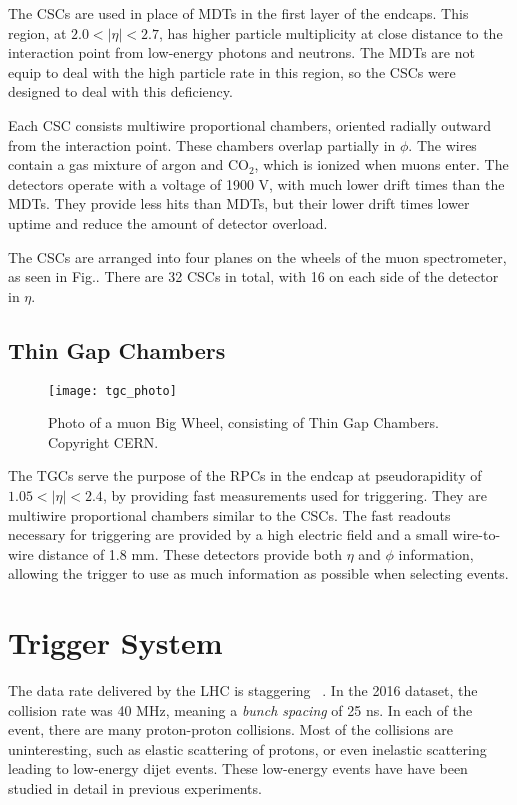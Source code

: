 The CSCs are used in place of MDTs in the first layer of the endcaps.
This region, at $2.0 < |\eta| < 2.7$, has higher particle multiplicity at close distance to the interaction point from low-energy photons and neutrons.
The MDTs are not equip to deal with the high particle rate in this region, so the CSCs were designed to deal with this deficiency.

Each CSC consists multiwire proportional chambers, oriented radially outward from the interaction point.
These chambers overlap partially in $\phi$.
The wires contain a gas mixture of argon and CO$_2$, which is ionized when muons enter.
The detectors operate with a voltage of 1900 V, with much lower drift times than the MDTs.
They provide less hits than MDTs, but their lower drift times lower uptime and reduce the amount of detector overload.

The CSCs are arranged into four planes on the wheels of the muon spectrometer, as seen in Fig..
There are 32 CSCs in total, with 16 on each side of the detector in $\eta.$

\subsection{Thin Gap Chambers}
\begin{figure}[tbp]
\caption{Photo of a muon Big Wheel, consisting of Thin Gap Chambers. Copyright CERN.} \label{fig:tgc_photo}
\texttt{[image: tgc\_photo]}
\end{figure}

The TGCs serve the purpose of the RPCs in the endcap at pseudorapidity of $1.05 < |\eta| < 2.4 $, by providing fast measurements used for triggering.
They are multiwire proportional chambers similar to the CSCs.
The fast readouts necessary for triggering are provided by a high electric field and a small wire-to-wire distance of 1.8 mm.
These detectors provide both $\eta$ and $\phi$ information, allowing the trigger to use as much information as possible when selecting events.

\section{Trigger System}\label{sec:trigger}

The data rate delivered by the LHC is staggering ~\cite{ATL-DAQ-PUB-2016-001}.
In the 2016 dataset, the collision rate was 40 MHz, meaning a \textit{bunch spacing} of 25 ns.
In each of the event, there are many proton-proton collisions.
Most of the collisions are uninteresting, such as elastic scattering of protons, or even inelastic scattering leading to low-energy dijet events.
These low-energy events have have been studied in detail in previous experiments.


